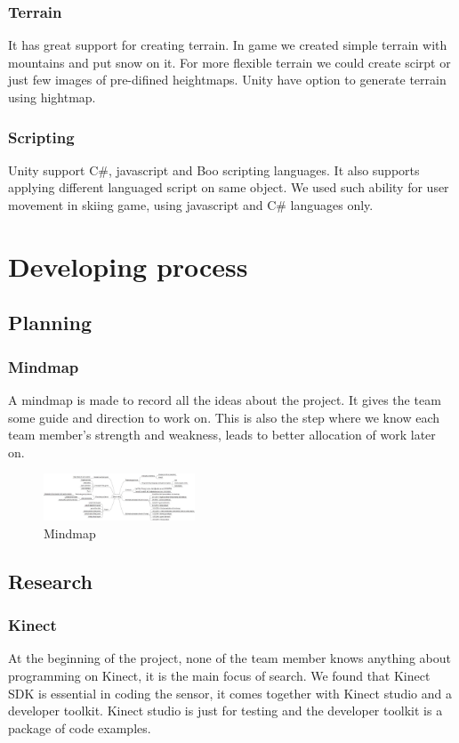 \documentclass[fonts]{icst}
\begin{document}
\subsubsection{Terrain}
It has great support for creating terrain. In game we created simple terrain with mountains and put snow on it. For more flexible terrain we could create scirpt or just few images of pre-difined heightmaps. Unity have option to generate terrain using hightmap.
\subsubsection{Scripting}
Unity support C\#, javascript and Boo scripting languages. It also supports applying different languaged script on same object. We used such ability for user movement in skiing game, using javascript and C\# languages only.

\section{Developing process}
\subsection{Planning}
\subsubsection{Mindmap}
A mindmap is made to record all the ideas about the project. It gives the team some guide and direction to work on. This is also the step where we know each team member's strength and weakness, leads to better allocation of work later on. 

\begin{figure}
    \centering
    \includegraphics[width=0.4\textwidth]{mindmap.png}
    \caption{Mindmap}
    \label{fig:awesome_image}
\end{figure}

\subsection{Research}
\subsubsection{Kinect}
At the beginning of the project, none of the team member knows anything about programming on Kinect, it is the main focus of search. We found that Kinect SDK is essential in coding the sensor, it comes together with Kinect studio and a developer toolkit. Kinect studio is just for testing and the developer toolkit is a package of code examples.
\end{document}
